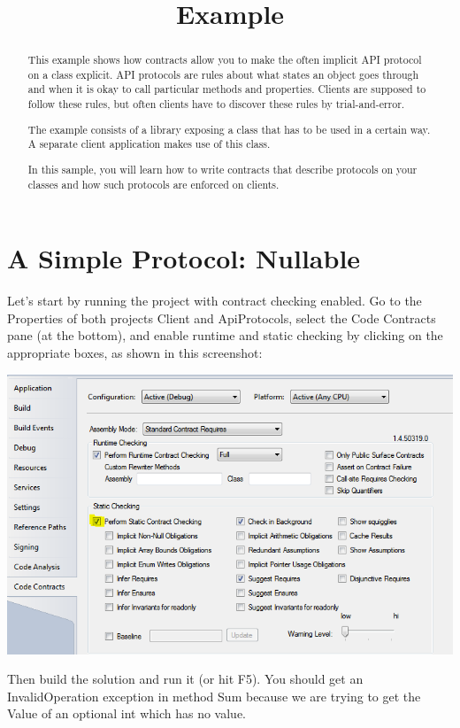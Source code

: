 \documentclass{article}
\title{\ProjectName{} Example}
\date{}
\newcommand{\ProjectName}{ApiProtocols}
\begin{document}
\maketitle
\begin{abstract}
This example shows how contracts allow you to make the often implicit API protocol on
a class explicit. API protocols are rules about what states an object
goes through and when it is okay to call particular methods and
properties. Clients are supposed to follow these rules, but often
clients have to discover these rules by trial-and-error.

The example consists of a library
exposing a class that has to be used in a certain way. A separate
client application makes use of this class.

In this sample, you will learn how to write contracts that describe
protocols on your classes and how such protocols are enforced on clients.
\end{abstract}



\section{A Simple Protocol: Nullable}
\label{sec:start}

Let's start by running the project with contract checking enabled. Go
to the Properties of both projects \textsf{Client} and \textsf{\ProjectName}, select the Code
Contracts pane (at the bottom), and enable runtime and static checking
by clicking on the appropriate boxes, as shown in this screenshot:
\begin{center}
  \includegraphics[width=.8\columnwidth]{pane.png}
\end{center}

Then build the solution and run it (or hit F5). You should get an
\textsf{InvalidOperation} exception in method \textsf{Sum} because we
are trying to get the \textsf{Value} of an optional int which has no value.
\end{document}
